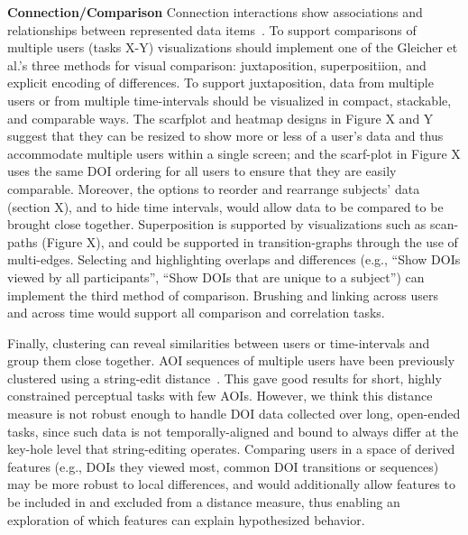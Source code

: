 \textbf{Connection/Comparison}
Connection interactions show associations and relationships between represented data items~\cite{yi2007toward}.  To support comparisons of multiple users (tasks X-Y) visualizations should implement one of the Gleicher et al.'s three methods for visual comparison: juxtaposition, superpositiion, and explicit encoding of differences. To support juxtaposition, data from multiple users or from multiple time-intervals should be visualized in compact, stackable, and comparable ways. The scarfplot and heatmap designs in Figure X and Y suggest that they can be resized to show more or less of a user's data and thus accommodate multiple users within a single screen; and the scarf-plot in Figure X uses the same DOI ordering for all users to ensure that they are easily comparable. Moreover, the options to reorder and rearrange subjects' data (section X), and to hide time intervals, would allow data to be compared to be brought close together. Superposition is supported by visualizations such as scan-paths (Figure X), and could be supported in transition-graphs through the use of multi-edges. Selecting and highlighting overlaps and differences (e.g., ``Show DOIs viewed by all participants'', ``Show DOIs that are unique to a subject'') can implement the third method of comparison. Brushing and linking across users and across time would support all comparison and correlation tasks.

 Finally, clustering can reveal similarities between users or time-intervals and group them close together. AOI sequences of multiple users have been previously clustered using a string-edit distance~\cite{kurzhals2014iseecube}. This gave good results for short, highly constrained perceptual tasks with few AOIs. However, we think this distance measure is not robust enough to handle DOI data collected over long, open-ended tasks, since such data is not temporally-aligned and bound to always differ at the key-hole level that string-editing operates. Comparing users in a space of derived features (e.g., DOIs they viewed most, common DOI transitions or sequences) may be more robust to local differences, and would additionally allow features to be included in and excluded from a distance measure, thus enabling an exploration of which features can explain hypothesized behavior.


